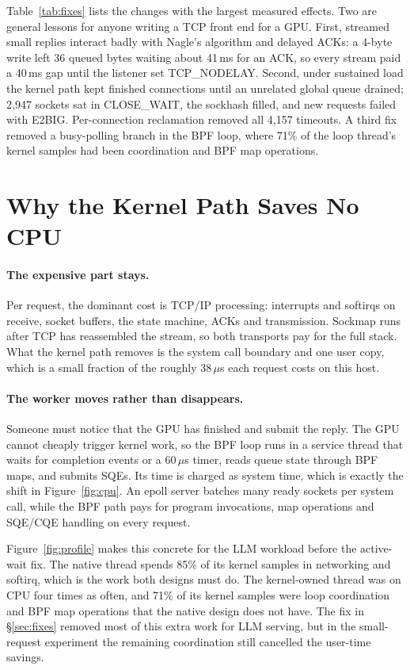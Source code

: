 \documentclass[sigconf,nonacm]{acmart}
\newcommand{\us}{\,$\mu$s}
\begin{document}
Table~\ref{tab:fixes} lists the changes with the largest measured effects. Two
are general lessons for anyone writing a TCP front end for a GPU. First,
streamed small replies interact badly with Nagle's algorithm and delayed ACKs:
a 4-byte write left 36 queued bytes waiting about 41\,ms for an ACK, so every
stream paid a 40\,ms gap until the listener set TCP\_NODELAY. Second, under
sustained load the kernel path kept finished connections until an unrelated
global queue drained; 2,947 sockets sat in CLOSE\_WAIT, the sockhash filled, and
new requests failed with E2BIG. Per-connection reclamation removed all 4,157
timeouts. A third fix removed a busy-polling branch in the BPF loop, where 71\%
of the loop thread's kernel samples had been coordination and BPF map
operations.

\section{Why the Kernel Path Saves No CPU}
\label{sec:why}

\paragraph{The expensive part stays.} Per request, the dominant cost is TCP/IP
processing: interrupts and softirqs on receive, socket buffers, the state
machine, ACKs and transmission. Sockmap runs after TCP has reassembled the
stream, so both transports pay for the full stack. What the kernel path removes
is the system call boundary and one user copy, which is a small fraction of the
roughly 38\us{} each request costs on this host.

\paragraph{The worker moves rather than disappears.} Someone must notice that
the GPU has finished and submit the reply. The GPU cannot cheaply trigger
kernel work, so the BPF loop runs in a service thread that waits for completion
events or a 60\us{} timer, reads queue state through BPF maps, and submits
SQEs. Its time is charged as system time, which is exactly the shift in
Figure~\ref{fig:cpu}. An epoll server batches many ready sockets per system
call, while the BPF path pays for program invocations, map operations and
SQE/CQE handling on every request.

Figure~\ref{fig:profile} makes this concrete for the LLM workload before the
active-wait fix. The native thread spends 85\% of its kernel samples in
networking and softirq, which is the work both designs must do. The
kernel-owned thread was on CPU four times as often, and 71\% of its kernel
samples were loop coordination and BPF map operations that the native design
does not have. The fix in \S\ref{sec:fixes} removed most of this extra work
for LLM serving, but in the small-request experiment the remaining
coordination still cancelled the user-time savings.
\end{document}
